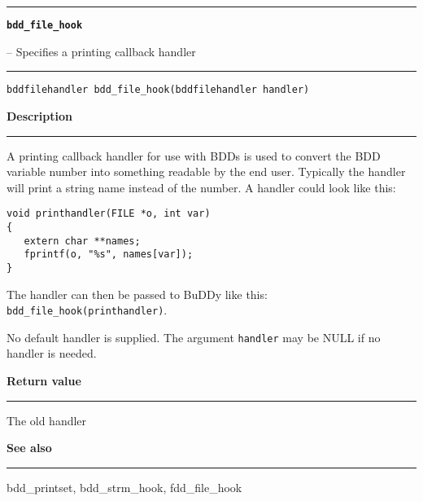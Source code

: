 \begin{minipage}{\textwidth}

\noindent\begin{minipage}{\textwidth}
\rule{\textwidth}{0.5mm}
{\tt\bf bdd\_file\_hook }
\--- Specifies a printing callback handler  \hspace{\fill}
\\\rule[1.5ex]{\textwidth}{0.5mm}
\end{minipage}

\noindent\begin{verbatim}
bddfilehandler bdd_file_hook(bddfilehandler handler) 
\end{verbatim}

\vspace{\parsep}\noindent
{\bf Description}\\\rule[1.5ex]{\textwidth}{0.2mm}\vspace{-1.5ex}\setlength{\parindent}{1em}
A printing callback handler for use with BDDs is used to
           convert the BDD variable number into something readable by the
	   end user. Typically the handler will print a string name
	   instead of the number. A handler could look like this:
	   \begin{verbatim}
void printhandler(FILE *o, int var)
{
   extern char **names;
   fprintf(o, "%s", names[var]);
}
\end{verbatim}

           \noindent
           The handler can then be passed to BuDDy like this:
	   {\tt bdd\_file\_hook(printhandler)}.

	   No default handler is supplied. The argument {\tt handler} may be
	   NULL if no handler is needed. 

\setlength{\parindent}{0em}\vspace{\parsep}\vspace{\baselineskip}\noindent
{\bf Return value}\\\rule[1.5ex]{\textwidth}{0.2mm}\vspace{-1.5ex}
The old handler 

\vspace{\parsep}\vspace{\baselineskip}\noindent
{\bf See also}\\\rule[1.5ex]{\textwidth}{0.2mm}\vspace{-1.5ex}
bdd\_printset, bdd\_strm\_hook, fdd\_file\_hook 
\end{minipage}
